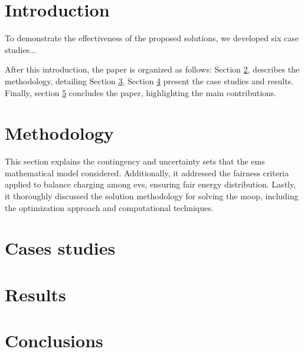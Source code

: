 \documentclass[12pt, 3p]{elsarticle}
\begin{document}

\glsresetall

\section{Introduction}\label{sec:intro}


To demonstrate the effectiveness of the proposed solutions, we developed 
six case studies...

After this introduction, the paper is organized as follows:
Section \ref{sec:methodology}, describes the methodology, detailing  
Section \ref{sec:cases_studies}, Section \ref{sec:results} 
present the case studies and results. 
Finally, section \ref{sec:conclusions} concludes the paper, 
highlighting the main contributions.

\section{Methodology}\label{sec:methodology}

This section explains the contingency and uncertainty sets that the \gls{ems} 
mathematical model considered. Additionally, it addressed the fairness criteria 
applied to balance charging among \glspl{ev}, ensuring fair energy distribution. 
Lastly, it thoroughly discussed the solution methodology for 
solving the \gls{moop}, including the optimization approach and computational 
techniques.

\section{Cases studies}\label{sec:cases_studies}

\section{Results}\label{sec:results}

\section{Conclusions}\label{sec:conclusions}




% 
% 
\end{document}
